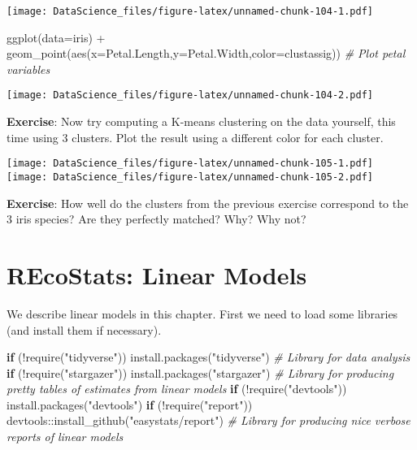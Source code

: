 \documentclass[
]{book}
\newenvironment{Shaded}{\begin{snugshade}}{\end{snugshade}}
\newcommand{\AttributeTok}[1]{\textcolor[rgb]{0.77,0.63,0.00}{#1}}
\newcommand{\CommentTok}[1]{\textcolor[rgb]{0.56,0.35,0.01}{\textit{#1}}}
\newcommand{\ControlFlowTok}[1]{\textcolor[rgb]{0.13,0.29,0.53}{\textbf{#1}}}
\newcommand{\FunctionTok}[1]{\textcolor[rgb]{0.00,0.00,0.00}{#1}}
\newcommand{\NormalTok}[1]{#1}
\newcommand{\SpecialCharTok}[1]{\textcolor[rgb]{0.00,0.00,0.00}{#1}}
\newcommand{\StringTok}[1]{\textcolor[rgb]{0.31,0.60,0.02}{#1}}
\begin{document}
\texttt{[image: DataScience\_files/figure-latex/unnamed-chunk-104-1.pdf]}

\begin{Shaded}
\begin{Highlighting}[]
\FunctionTok{ggplot}\NormalTok{(}\AttributeTok{data=}\NormalTok{iris) }\SpecialCharTok{+} \FunctionTok{geom\_point}\NormalTok{(}\FunctionTok{aes}\NormalTok{(}\AttributeTok{x=}\NormalTok{Petal.Length,}\AttributeTok{y=}\NormalTok{Petal.Width,}\AttributeTok{color=}\NormalTok{clustassig)) }\CommentTok{\# Plot petal variables}
\end{Highlighting}
\end{Shaded}

\texttt{[image: DataScience\_files/figure-latex/unnamed-chunk-104-2.pdf]}

\textbf{Exercise}: Now try computing a K-means clustering on the data yourself, this time using 3 clusters. Plot the result using a different color for each cluster.

\texttt{[image: DataScience\_files/figure-latex/unnamed-chunk-105-1.pdf]} \texttt{[image: DataScience\_files/figure-latex/unnamed-chunk-105-2.pdf]}

\textbf{Exercise}: How well do the clusters from the previous exercise correspond to the 3 iris species? Are they perfectly matched? Why? Why not?

\hypertarget{recostats-linear-models}{%
\chapter{REcoStats: Linear Models}\label{recostats-linear-models}}

We describe linear models in this chapter. First we need to load some libraries (and install them if necessary).

\begin{Shaded}
\begin{Highlighting}[]
\ControlFlowTok{if}\NormalTok{ (}\SpecialCharTok{!}\FunctionTok{require}\NormalTok{(}\StringTok{"tidyverse"}\NormalTok{)) }\FunctionTok{install.packages}\NormalTok{(}\StringTok{"tidyverse"}\NormalTok{) }\CommentTok{\# Library for data analysis}
\ControlFlowTok{if}\NormalTok{ (}\SpecialCharTok{!}\FunctionTok{require}\NormalTok{(}\StringTok{"stargazer"}\NormalTok{)) }\FunctionTok{install.packages}\NormalTok{(}\StringTok{"stargazer"}\NormalTok{) }\CommentTok{\# Library for producing pretty tables of estimates from linear models}
\ControlFlowTok{if}\NormalTok{ (}\SpecialCharTok{!}\FunctionTok{require}\NormalTok{(}\StringTok{"devtools"}\NormalTok{)) }\FunctionTok{install.packages}\NormalTok{(}\StringTok{"devtools"}\NormalTok{)}
\ControlFlowTok{if}\NormalTok{ (}\SpecialCharTok{!}\FunctionTok{require}\NormalTok{(}\StringTok{"report"}\NormalTok{)) devtools}\SpecialCharTok{::}\FunctionTok{install\_github}\NormalTok{(}\StringTok{"easystats/report"}\NormalTok{) }\CommentTok{\# Library for producing nice verbose reports of linear models}
\end{Highlighting}
\end{Shaded}
\end{document}
